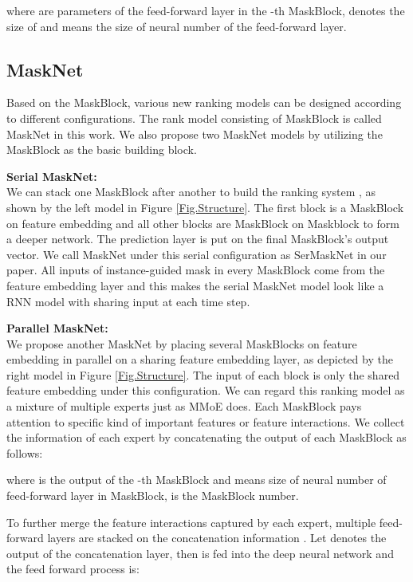 \documentclass[sigconf]{acmart}
\begin{document}
where  are parameters of the feed-forward layer in the -th MaskBlock,  denotes the size of  and  means the size of neural number of the feed-forward layer.








\subsection{MaskNet}

Based on the MaskBlock, various new ranking models can be designed according to different configurations.  The rank model consisting of MaskBlock is called MaskNet in this work. We also propose two MaskNet models by utilizing the MaskBlock as the basic building block.




\noindent\textbf{Serial MaskNet: }\\
\noindent We can stack one MaskBlock after another to build the ranking system , as shown by the left model in  Figure \ref{Fig.Structure}. The first block is a MaskBlock on feature embedding and all other blocks are MaskBlock on Maskblock to form a deeper network. The prediction layer is put on the final MaskBlock's output vector. We call MaskNet under this serial configuration as SerMaskNet in our paper. All  inputs of instance-guided mask in every MaskBlock come from the feature embedding layer  and this makes the serial MaskNet model look like a RNN model with sharing input at each time step.

\noindent\textbf{Parallel MaskNet: }\\
\noindent We propose another MaskNet by placing  several MaskBlocks on feature embedding in parallel on a sharing feature embedding layer, as depicted by the right model in Figure \ref{Fig.Structure}. The input of each block is only the shared feature embedding  under this configuration. We can regard this ranking model as a mixture of multiple experts  just as  MMoE\cite{ma2018modeling} does. Each MaskBlock pays attention to specific kind of important features or feature interactions. We collect the information of each expert by concatenating the output of each MaskBlock as follows:

where  is the output of the -th MaskBlock and  means size of neural number of feed-forward layer in MaskBlock,  is the MaskBlock number.


To further merge the feature interactions captured by each expert, multiple feed-forward layers are stacked on the concatenation information . Let  denotes the output of the concatenation layer, then  is fed into the deep neural network and the feed forward process is:
\end{document}
